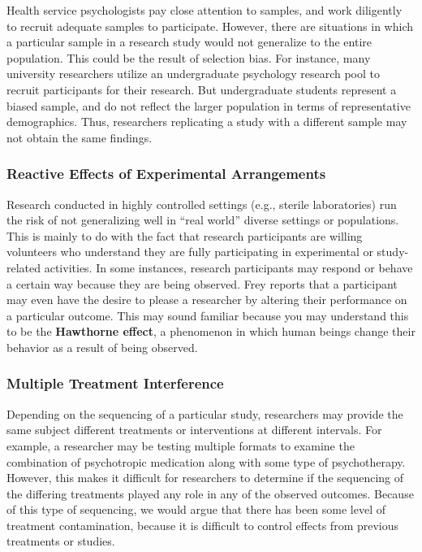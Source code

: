 \documentclass[
  11pt,
]{book}
\begin{document}
Health service psychologists pay close attention to samples, and work diligently to recruit adequate samples to participate. However, there are situations in which a particular sample in a research study would not generalize to the entire population. This could be the result of selection bias. For instance, many university researchers utilize an undergraduate psychology research pool to recruit participants for their research. But undergraduate students represent a biased sample, and do not reflect the larger population in terms of representative demographics. Thus, researchers replicating a study with a different sample may not obtain the same findings.

\subsubsection{Reactive Effects of Experimental Arrangements}\label{reactive-effects-of-experimental-arrangements}

Research conducted in highly controlled settings (e.g., sterile laboratories) run the risk of not generalizing well in ``real world'' diverse settings or populations. This is mainly to do with the fact that research participants are willing volunteers who understand they are fully participating in experimental or study-related activities. In some instances, research participants may respond or behave a certain way because they are being observed. Frey \citeyearpar{frey_sage_2018} reports that a participant may even have the desire to please a researcher by altering their performance on a particular outcome. This may sound familiar because you may understand this to be the \textbf{Hawthorne effect}, a phenomenon in which human beings change their behavior as a result of being observed.

\subsubsection{Multiple Treatment Interference}\label{multiple-treatment-interference}

Depending on the sequencing of a particular study, researchers may provide the same subject different treatments or interventions at different intervals. For example, a researcher may be testing multiple formats to examine the combination of psychotropic medication along with some type of psychotherapy. However, this makes it difficult for researchers to determine if the sequencing of the differing treatments played any role in any of the observed outcomes. Because of this type of sequencing, we would argue that there has been some level of treatment contamination, because it is difficult to control effects from previous treatments or studies.
\end{document}
